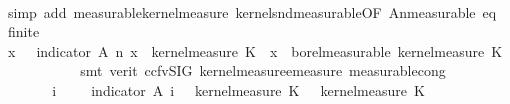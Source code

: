 \begin{isabellebody}
\ \ \ \ \ \ \ \ \isamarkupfalse%
\ {\isacharparenleft}{\kern0pt}simp\ add{\isacharcolon}{\kern0pt}\ measurable{\isacharunderscore}{\kern0pt}kernel{\isacharunderscore}{\kern0pt}measure\ kernel{\isacharunderscore}{\kern0pt}snd{\isacharunderscore}{\kern0pt}measurable{\isacharbrackleft}{\kern0pt}OF\ A{\isacharunderscore}{\kern0pt}n{\isacharunderscore}{\kern0pt}measurable\ eq\ {\isacharasterisk}{\kern0pt}\ finite{\isacharparenleft}{\kern0pt}{}{\isacharparenright}{\kern0pt}{\isacharbrackright}{\kern0pt}{\isacharparenright}{\kern0pt}\isanewline
\ \ \ \ \ \ \isamarkupfalse%
\ \isamarkupfalse%
\ {\isachardoublequoteopen}{\isacharparenleft}{\kern0pt}{\isasymlambda}x{\isachardot}{\kern0pt}\ {\isasymintegral}\isactrlsup {\isacharplus}{\kern0pt}\ {\isasymomega}\ indicator\ {\isacharparenleft}{\kern0pt}A\ n{\isacharparenright}{\kern0pt}\ {\isacharparenleft}{\kern0pt}x{\isacharcomma}{\kern0pt}\ {\isasymomega}\ {\isasympartial}kernel{\isacharunderscore}{\kern0pt}measure\ K{\isacharunderscore}{\kern0pt}{}\ {\isacharparenleft}{\kern0pt}{\isasymomega}\ x{\isacharparenright}{\kern0pt}{\isacharparenright}{\kern0pt}\ {\isasymin}\ borel{\isacharunderscore}{\kern0pt}measurable\ {\isacharparenleft}{\kern0pt}kernel{\isacharunderscore}{\kern0pt}measure\ K{\isacharunderscore}{\kern0pt}{}\ {\isasymomega}\isanewline
\ \ \ \ \ \ \ \ \isamarkupfalse%
\ {\isacharparenleft}{\kern0pt}smt\ {\isacharparenleft}{\kern0pt}verit{\isacharcomma}{\kern0pt}\ ccfv{\isacharunderscore}{\kern0pt}SIG{\isacharparenright}{\kern0pt}\ kernel{\isacharunderscore}{\kern0pt}measure{\isacharunderscore}{\kern0pt}emeasure\ measurable{\isacharunderscore}{\kern0pt}cong{\isacharparenright}{\kern0pt}\isanewline
\ \ \ \ \isamarkupfalse%
\isanewline
\ \ \ \ \isamarkupfalse%
\ \isamarkupfalse%
\ {\isachardoublequoteopen}{\isacharparenleft}{\kern0pt}{\isasymSum}i{\isachardot}{\kern0pt}\ {\isasymintegral}\isactrlsup {\isacharplus}{\kern0pt}\ {\isasymomega}\ {\isasymintegral}\isactrlsup {\isacharplus}{\kern0pt}\ {\isasymomega}\ indicator\ {\isacharparenleft}{\kern0pt}A\ i{\isacharparenright}{\kern0pt}\ {\isacharparenleft}{\kern0pt}{\isasymomega}\ {\isasymomega}\ {\isasympartial}kernel{\isacharunderscore}{\kern0pt}measure\ K{\isacharunderscore}{\kern0pt}{}\ {\isacharparenleft}{\kern0pt}{\isasymomega}\ {\isasymomega}\ {\isasympartial}kernel{\isacharunderscore}{\kern0pt}measure\ K{\isacharunderscore}{\kern0pt}{}\ {\isasymomega}\ {\isacharequal}{\kern0pt}\isanewline

\end{isabellebody}
